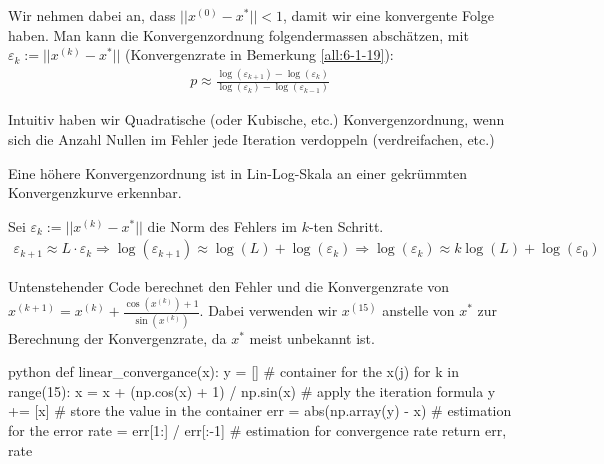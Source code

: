 \drmvspace
Wir nehmen dabei an, dass $||x^{(0)} - x^*|| < 1$, damit wir eine konvergente Folge haben.
Man kann die Konvergenzordnung folgendermassen abschätzen, mit $\varepsilon_k := ||x^{(k)} - x^*||$ (Konvergenzrate in Bemerkung \ref{all:6-1-19}):
\rmvspace
\begin{align*}
    p \approx \frac{\log(\varepsilon_{k + 1}) - \log(\varepsilon_k)}{\log(\varepsilon_k) - \log(\varepsilon_{k - 1})}
\end{align*}

\drmvspace
Intuitiv haben wir Quadratische (oder Kubische, etc.) Konvergenzordnung, wenn sich die Anzahl Nullen im Fehler jede Iteration verdoppeln (verdreifachen, etc.)

\numberingOff
\inlineremark Eine höhere Konvergenzordnung ist in Lin-Log-Skala an einer gekrümmten Konvergenzkurve erkennbar.
\numberingOn

\rmvspace{}
 Sei $\varepsilon_k := ||x^{(k)} - x^*||$ die Norm des Fehlers im $k$-ten Schritt.
\drmvspace\rmvspace
\begin{align*}
    \varepsilon_{k + 1} \approx L \cdot \varepsilon_k \Longrightarrow \log(\varepsilon_{k + 1}) \approx \log(L) + \log(\varepsilon_k)
    \Longrightarrow \log(\varepsilon_k) \approx k \log(L) + \log(\varepsilon_0)
\end{align*}

\drmvspace
Untenstehender Code berechnet den Fehler und die Konvergenzrate von $\displaystyle x^{(k + 1)} = x^{(k)} + \frac{\cos(x^{(k)}) + 1}{\sin(x^{(k)})}$.
Dabei verwenden wir $x^{(15)}$ anstelle von $x^*$ zur Berechnung der Konvergenzrate, da $x^*$ meist unbekannt ist.

\drmvspace
\begin{code}{python}
    def linear_convergance(x):
        y = []  # container for the x(j)
        for k in range(15):
            x = x + (np.cos(x) + 1) / np.sin(x)  # apply the iteration formula
            y += [x]  # store the value in the container
        err = abs(np.array(y) - x)  # estimation for the error
        rate = err[1:] / err[:-1]
        # estimation for convergence rate
        return err, rate
\end{code}
